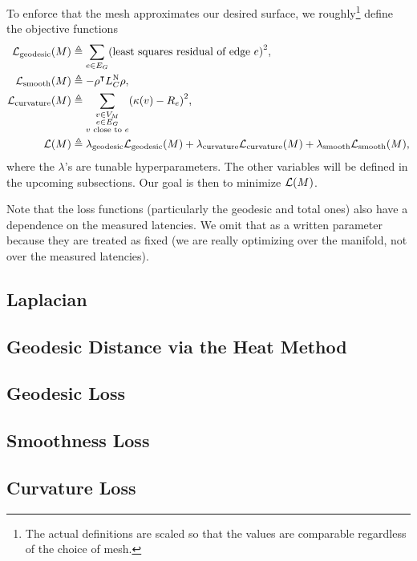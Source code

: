 \documentclass[10pt]{article}
\newcommand*\delimeter[3]{
	\ensuremath{\mathopen{}\left#2 #1\right#3\mathclose{}{\vphantom{\left#2 #1\right#3}}}
}
\newcommand*\pof[1]{\delimeter{#1}{(}{)}}
\begin{document}
	To enforce that the mesh approximates our desired surface, we roughly\footnote{The actual definitions are scaled so that the values are comparable regardless of the choice of mesh.} define the objective functions \begin{align*}
		\mathcal{L}_{\mathrm{geodesic}}\pof{M} &\triangleq \sum_{e \in E_G} \pof{\text{least squares residual of edge \(e\)}}^2, \\
		\mathcal{L}_{\mathrm{smooth}}\pof{M} &\triangleq -\rho^\intercal L_C^{\text{N}}\rho, \\
		\mathcal{L}_{\mathrm{curvature}}\pof{M} &\triangleq \sum_{\substack{v \in V_M \\ e \in E_G \\ \text{\(v\) close to \(e\)}}} \pof{\kappa\pof{v} - R_e}^2, \\
		\mathcal{L}\pof{M} &\triangleq \lambda_{\mathrm{geodesic}}\mathcal{L}_{\mathrm{geodesic}}\pof{M} + \lambda_{\mathrm{curvature}}\mathcal{L}_{\mathrm{curvature}}\pof{M} + \lambda_{\mathrm{smooth}}\mathcal{L}_{\mathrm{smooth}}\pof{M},
	\end{align*} where the \(\lambda\)'s are tunable hyperparameters. The other variables will be defined in the upcoming subsections. Our goal is then to minimize \(\mathcal{L}\pof{M}\).

	Note that the loss functions (particularly the geodesic and total ones) also have a dependence on the measured latencies. We omit that as a written parameter because they are treated as fixed (we are really optimizing over the manifold, not over the measured latencies).

	\subsection{Laplacian}
	

	\subsection{Geodesic Distance via the Heat Method}
	

	\subsection{Geodesic Loss}
	

	\subsection{Smoothness Loss}
	

	\subsection{Curvature Loss}
	
\end{document}
